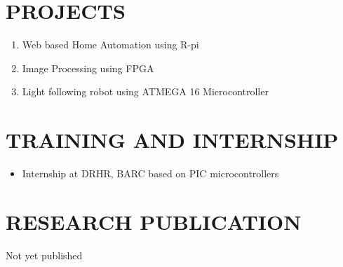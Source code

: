 \documentclass[line, margin]{res}
\begin{document}
\begin{resume}
\section{\bf PROJECTS}
\begin{enumerate}
	\item Web based Home Automation using R-pi
	\item Image Processing using FPGA
	\item Light following robot using ATMEGA 16 Microcontroller
\end{enumerate}

\section{\bf TRAINING AND INTERNSHIP} 
\begin{itemize}
	\item Internship at DRHR, BARC based on PIC microcontrollers 
\end{itemize}

\vspace{2mm}

\section{\bf RESEARCH PUBLICATION} 
Not yet published 

\vspace{2mm}

\end{resume}
\end{document}
